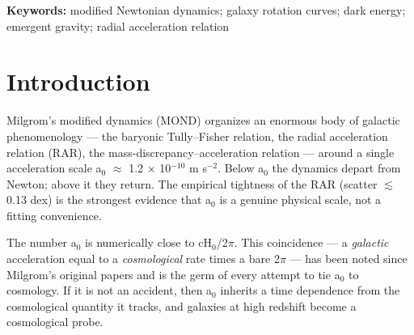 \documentclass[aps,prd,preprint,nofootinbib,superscriptaddress]{revtex4-2}
\begin{document}
\begin{abstract}
derives the acceleration-selective coupling structure and a closed-form
kernel (a/4\(\pi\))cot(\(\pi\)a/\(\kappa\)) in which the conjectured
Green-function 4\(\pi\) genuinely appears (derived in a proxy model),
but not yet the full a\(_{0}\) coefficient, which remains open. The
coefficient-independent, pre-registered prediction is a\(_{0}\)(z)
\(\propto\) H(z) with \textbf{no saturation gate} --- MOND
\emph{strengthens} at high z (a\(_{0}\)(3)/a\(_{0}\)(0) \(\approx\) 4.5
while \(\Omega\)\_DE(z=3) \(\approx\) 3\%) --- falsifiable by JWST
high-z rotators, though existing declining high-z rotation curves
already disfavour a strongly rising a\(_{0}\) \citep{Milgrom:2017hpv}:
the central tension this branch must survive.
\end{abstract}

\maketitle

\noindent\textbf{Keywords:} modified Newtonian dynamics; galaxy rotation
curves; dark energy; emergent gravity; radial acceleration relation
\vspace{6pt}

\section{Introduction}\label{sec-1}

Milgrom's modified dynamics (MOND) \citep{Milgrom:1983ca, Famaey:2011kh}
organizes an enormous body of galactic phenomenology --- the baryonic
Tully--Fisher relation, the radial acceleration relation (RAR), the
mass-discrepancy--acceleration relation --- around a single acceleration
scale a\(_{0}\) \(\approx\) 1.2 × 10\(^{-10}\) m s\(^{-2}\). Below
a\(_{0}\) the dynamics depart from Newton; above it they return. The
empirical tightness of the RAR (scatter \(\lesssim\) 0.13 dex)
\citep{McGaugh:2016leg, Lelli:2016cui} is the strongest evidence that
a\(_{0}\) is a genuine physical scale, not a fitting convenience.

The number a\(_{0}\) is numerically close to cH\(_{0}\)/2\(\pi\). This
coincidence --- a \emph{galactic} acceleration equal to a
\emph{cosmological} rate times a bare 2\(\pi\) --- has been noted since
Milgrom's original papers \citep{Milgrom:2020cch} and is the germ of
every attempt to tie a\(_{0}\) to cosmology. If it is not an accident,
then a\(_{0}\) inherits a time dependence from the cosmological quantity
it tracks, and galaxies at high redshift become a cosmological probe.
\end{document}
